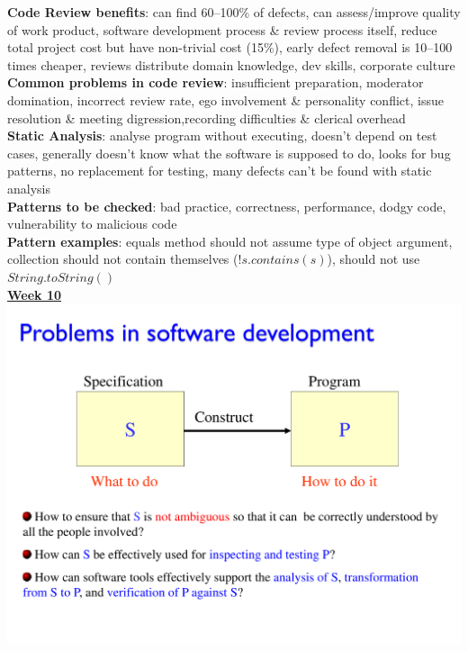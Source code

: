 \documentclass[a4paper]{article}
\begin{document}
\begin{multicols}{3}
        \textbf{Code Review benefits}: can find 60--100\% of defects, can assess/improve quality of work product, software development process \& review process itself, reduce total project cost but have non-trivial cost (15\%), early defect removal is 10--100 times cheaper, reviews distribute domain knowledge, dev skills, corporate culture\\
        \textbf{Common problems in code review}: insufficient preparation, moderator domination, incorrect review rate, ego involvement \& personality conflict, issue resolution \& meeting digression,recording difficulties \& clerical overhead\\
        \textbf{Static Analysis}: analyse program without executing, doesn't depend on test cases, generally doesn't know what the software is supposed to do, looks for bug patterns, no replacement for testing, many defects can't be found with static analysis\\
        \textbf{Patterns to be checked}: bad practice, correctness, performance, dodgy code, vulnerability to malicious code\\
        \textbf{Pattern examples}: equals method should not assume type of object argument, collection should not contain themselves ($!s.contains(s)$), should not use $String.toString()$\\
        \vfill\null\columnbreak\noindent\underline{\textbf{Week 10}}\\
        \includegraphics[width=\linewidth]{435.pdf}\\

\end{multicols}
\end{document}
